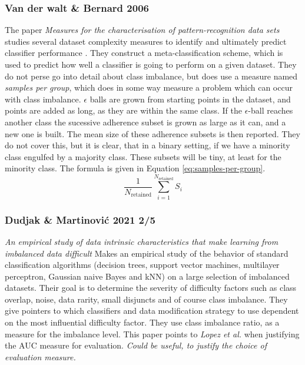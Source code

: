 \subsubsection*{Van der walt \& Bernard 2006}
The paper \emph{Measures for the characterisation of pattern-recognition data sets} studies several dataset complexity measures to identify and ultimately predict classifier performance \cite{van2007measures}. They construct a meta-classification scheme, which is used to predict how well a classifier is going to perform on a given dataset. They do not perse go into detail about class imbalance, but does use a measure named \emph{samples per group}, which does in some way measure a problem which can occur with class imbalance. $\epsilon$ balls are grown from starting points in the dataset, and points are added as long, as they are within the same class. If the $\epsilon$-ball reaches another class the sucessive adherence subset is grown as large as it can, and a new one is built. The mean size of these adherence subsets is then reported. They do not cover this, but it is clear, that in a binary setting, if we have a minority class engulfed by a majority class. These subsets will be tiny, at least for the minority class. The formula is given in Equation \ref{eq:samples-per-group}.
\begin{equation}
    \label{eq:samples-per-group}
    \frac{1}{N_\text{retained}} \sum_{i=1}^{N_\text{retained}} S_i
\end{equation}

\subsubsection*{Dudjak \& Martinović 2021 2/5}
\emph{An empirical study of data intrinsic characteristics that make learning from
imbalanced data difficult} \cite{dudjak2021empirical} Makes an empirical study of the behavior of standard classification algorithms (decision trees, support vector machines, multilayer perceptron, Gaussian naive Bayes and kNN) on a large selection of imbalanced datasets. Their goal is to determine the severity of difficulty factors such as class overlap, noise, data rarity, small disjuncts and of course class imbalance. They give pointers to which classifiers and data modification strategy to use dependent on the most influential difficulty factor. They use class imbalance ratio, as a measure for the imbalance level. This paper points to \emph{Lopez et al.} when justifying the AUC measure for evaluation. \emph{Could be useful, to justify the choice of evaluation measure.}

